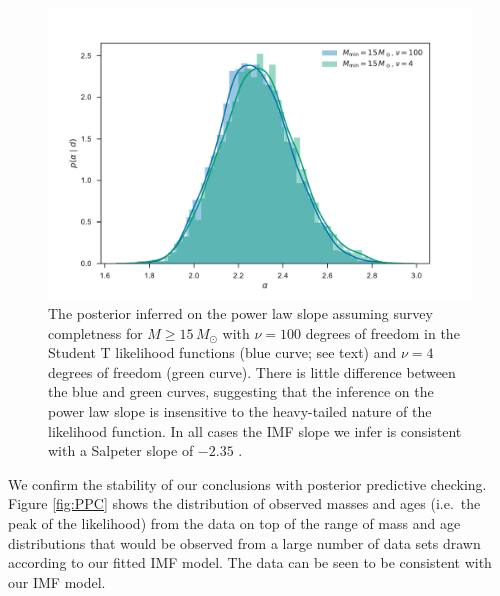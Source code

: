 \documentclass[apjl]{emulateapj}
\newcommand{\MSun}{M_\odot}
\begin{document}
\begin{figure}
    		    		\includegraphics[width=\columnwidth]{alpha.pdf}
    		\caption{The posterior inferred on the power law slope assuming survey completness for $M \geq 15 \, \MSun$ with $\nu = 100$ degrees of freedom in the Student T likelihood functions (blue curve; see text) and $\nu = 4$ degrees of freedom (green curve).  There is little difference between the blue and green curves, suggesting that the inference on the power law slope is insensitive to the heavy-tailed nature of the likelihood function.  In all cases the IMF slope we infer is consistent with a Salpeter slope of $-2.35$ \citep{Salpeter:1955}. }\label{fig:IMF}
\end{figure}

We confirm the stability of our conclusions with posterior predictive checking.
Figure \ref{fig:PPC} shows the distribution of observed masses and ages (i.e.\
the peak of the likelihood) from the \citet{Schneider:2018} data on top of the
range of mass and age distributions that would be observed from a large number
of data sets drawn according to our fitted IMF model.  The data can be seen to
be consistent with our IMF model.
\end{document}
